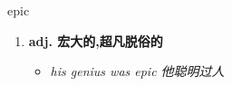 
\begin{frame}
{\huge epic}
\begin{center}
\begin{enumerate}\Large
  \item \textbf{adj. 宏大的,超凡脱俗的}
  \begin{itemize}
    \item \em{\Large{his genius was epic 他聪明过人}}
  \end{itemize}
\end{enumerate}
\end{center}
\end{frame}
